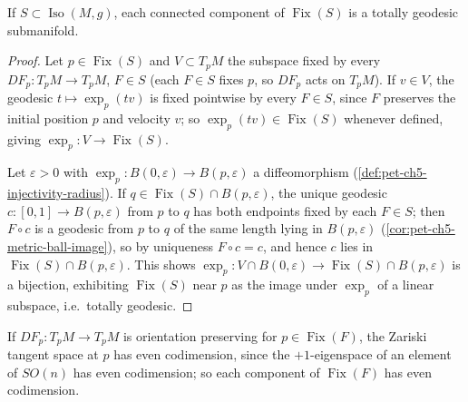 \begin{proposition}
  \label{prop:pet-ch5-fixed-point-totally-geodesic}
  If $S\subset\operatorname{Iso}(M,g)$, each connected component of
  $\operatorname{Fix}(S)$ is a totally geodesic submanifold.
\end{proposition}
\begin{proof}
  Let $p\in\operatorname{Fix}(S)$ and $V\subset T_pM$ the subspace fixed by every
  $DF_p:T_pM\to T_pM$, $F\in S$ (each $F\in S$ fixes $p$, so $DF_p$ acts on
  $T_pM$). If $v\in V$, the geodesic $t\mapsto\exp_p(tv)$ is fixed pointwise by
  every $F\in S$, since $F$ preserves the initial position $p$ and velocity $v$; so
  $\exp_p(tv)\in\operatorname{Fix}(S)$ whenever defined, giving $\exp_p:V\to
  \operatorname{Fix}(S)$.

  Let $\varepsilon>0$ with $\exp_p:B(0,\varepsilon)\to B(p,\varepsilon)$ a
  diffeomorphism (\cref{def:pet-ch5-injectivity-radius}). If $q\in\operatorname{Fix}(S)
  \cap B(p,\varepsilon)$, the unique geodesic $c:[0,1]\to B(p,\varepsilon)$ from $p$
  to $q$ has both endpoints fixed by each $F\in S$; then $F\circ c$ is a geodesic
  from $p$ to $q$ of the same length lying in $B(p,\varepsilon)$
  (\cref{cor:pet-ch5-metric-ball-image}), so by uniqueness $F\circ c=c$, and hence
  $c$ lies in $\operatorname{Fix}(S)\cap B(p,\varepsilon)$. This shows
  $\exp_p:V\cap B(0,\varepsilon)\to\operatorname{Fix}(S)\cap B(p,\varepsilon)$ is a
  bijection, exhibiting $\operatorname{Fix}(S)$ near $p$ as the image under $\exp_p$
  of a linear subspace, i.e.\ totally geodesic.
\end{proof}

\begin{remark}
  \label{rem:pet-ch5-fixed-point-codimension}
  If $DF_p:T_pM\to T_pM$ is orientation preserving for $p\in\operatorname{Fix}(F)$,
  the Zariski tangent space at $p$ has even codimension, since the $+1$-eigenspace
  of an element of $SO(n)$ has even codimension; so each component of
  $\operatorname{Fix}(F)$ has even codimension.
\end{remark}

